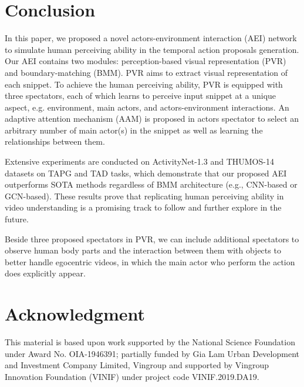 \documentclass{bmvc2k}
\begin{document}
\section*{Conclusion}
In this paper, we proposed a novel actors-environment interaction (AEI) network to simulate human perceiving ability in the temporal action proposals generation. Our AEI contains two modules: perception-based visual representation (PVR) and boundary-matching (BMM). PVR aims to extract visual representation of each snippet. To achieve the human perceiving ability, PVR is equipped with three spectators, each of which learns to perceive input snippet at a unique aspect, e.g. environment, main actors, and actors-environment interactions. An adaptive attention mechanism (AAM) is proposed in actors spectator to select an arbitrary number of main actor(s) in the snippet as well as learning the relationships between them.

Extensive experiments are conducted on ActivityNet-1.3 and THUMOS-14 datasets on TAPG and TAD tasks, which demonstrate that our proposed AEI outperforms SOTA methods regardless of BMM architecture (e.g., CNN-based or GCN-based). These results prove that replicating human perceiving ability in video understanding is a promising track to follow and further explore in the future. 

Beside three proposed spectators in PVR, we can include additional spectators to observe human body parts and the interaction between them with objects to better handle egocentric videos, in which the main actor who perform the action does explicitly appear.

\newpage






















































\section*{Acknowledgment}
This material is based upon work supported by the National Science Foundation under Award No. OIA-1946391; partially funded by Gia Lam Urban Development and Investment Company Limited, Vingroup and supported by Vingroup Innovation Foundation (VINIF) under project code VINIF.2019.DA19.


\end{document}

